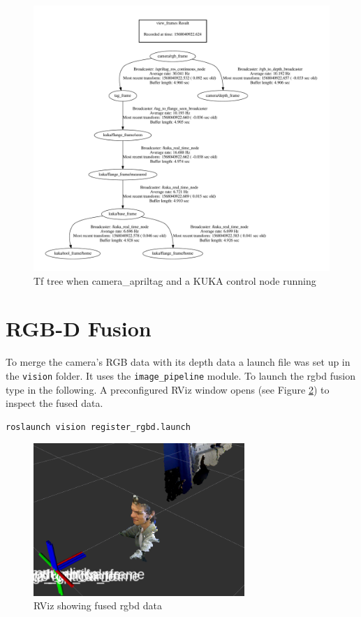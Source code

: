 \documentclass[headsepline,footinclude=false,fontsize=11pt,paper=a4,listof=totoc,bibliography=totoc,BCOR=12mm,DIV=14]{scrbook}
\begin{document}
\begin{figure}[h]
    \centering
    \includegraphics[width=\textwidth]{figures/camera_frames}
    \caption{Tf tree when camera\_apriltag and a KUKA control node running}
    \label{fig:camera_frames}
\end{figure}

\newpage
\section{RGB-D Fusion}\label{rgbd}

To merge the camera's RGB data with its depth data a launch file was set up in the \texttt{vision} folder. It uses the \texttt{image\_pipeline} module. To launch the \gls{rgbd} fusion type in the following. A preconfigured RViz window opens (see Figure \ref{fig:rviz}) to inspect the fused data. 

\begin{lstlisting}[language=bash, caption={Launching \gls{rgbd} fusion nodes}]
roslaunch vision register_rgbd.launch
\end{lstlisting}

\begin{figure}[h]
    \centering
    \includegraphics[width=8cm]{figures/rgbd_fusion}
    \caption{RViz showing fused \gls{rgbd} data}
    \label{fig:rviz}
\end{figure}
\end{document}
